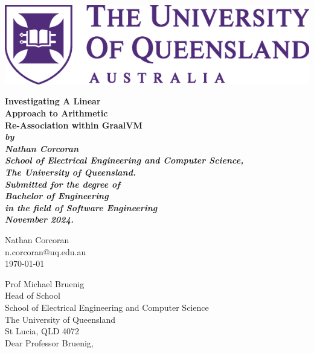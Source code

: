 \documentclass[12pt,openany,a4paper]{book}
\renewcommand{\baselinestretch}{1.2}	%
\begin{document}
\frontmatter

\begin{titlepage}
\begin{center}
\includegraphics[width=\linewidth]{UQLogo.png}
\end{center}
\renewcommand{\baselinestretch}{1.0}
\begin{center}
\vspace*{35mm}
\Huge\bf
        Investigating A Linear\\
        Approach to Arithmetic\\
        Re-Association within GraalVM\\
\vspace{20mm}
\large\sl
		by\\
		Nathan Corcoran
		\medskip\\
\rm
		School of Electrical Engineering and Computer Science,\\
		The University of Queensland.\\
\vspace{30mm}
		Submitted for the degree of\\
		Bachelor of Engineering
		\smallskip\\
\normalsize
		in the field of Software Engineering
		\medskip\\
\large
		November 2024.
\end{center}
\end{titlepage}

\cleardoublepage

\begin{flushright}
    Nathan Corcoran\\
    n.corcoran@uq.edu.au\\
	\medskip
	\today
\end{flushright}
\begin{flushleft}
  Prof Michael Bruenig\\
  Head of School\\
  School of Electrical Engineering and Computer Science\\
  The University of Queensland\\
  St Lucia, QLD 4072\\
  \bigskip\bigskip
  Dear Professor Bruenig,
\end{flushleft}
\end{document}
